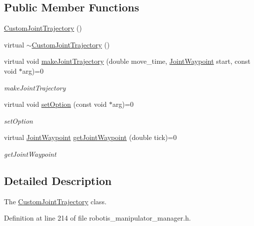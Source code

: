 \subsection*{Public Member Functions}
\begin{DoxyCompactItemize}
\item 
\hyperlink{classrobotis__manipulator_1_1_custom_joint_trajectory_a68daf69c70b60f58a30b235618448bd6}{Custom\+Joint\+Trajectory} ()
\item 
virtual \hyperlink{classrobotis__manipulator_1_1_custom_joint_trajectory_a0b26437cc90db37b0054f57ce4619fc3}{$\sim$\+Custom\+Joint\+Trajectory} ()
\item 
virtual void \hyperlink{classrobotis__manipulator_1_1_custom_joint_trajectory_af407a0f777289295dd1bbae692d5761a}{make\+Joint\+Trajectory} (double move\+\_\+time, \hyperlink{namespacerobotis__manipulator_a4456fd8b14e1f6b7733a77837dfe9339}{Joint\+Waypoint} start, const void $\ast$arg)=0
\begin{DoxyCompactList}\small\item\em make\+Joint\+Trajectory \end{DoxyCompactList}\item 
virtual void \hyperlink{classrobotis__manipulator_1_1_custom_joint_trajectory_a3e6eb8b2ad0c0b9647864e377b41d099}{set\+Option} (const void $\ast$arg)=0
\begin{DoxyCompactList}\small\item\em set\+Option \end{DoxyCompactList}\item 
virtual \hyperlink{namespacerobotis__manipulator_a4456fd8b14e1f6b7733a77837dfe9339}{Joint\+Waypoint} \hyperlink{classrobotis__manipulator_1_1_custom_joint_trajectory_aa8f8cae5e28d0b4400d4ba9af9a3c396}{get\+Joint\+Waypoint} (double tick)=0
\begin{DoxyCompactList}\small\item\em get\+Joint\+Waypoint \end{DoxyCompactList}\end{DoxyCompactItemize}


\subsection{Detailed Description}
The \hyperlink{classrobotis__manipulator_1_1_custom_joint_trajectory}{Custom\+Joint\+Trajectory} class. 

Definition at line 214 of file robotis\+\_\+manipulator\+\_\+manager.\+h.



